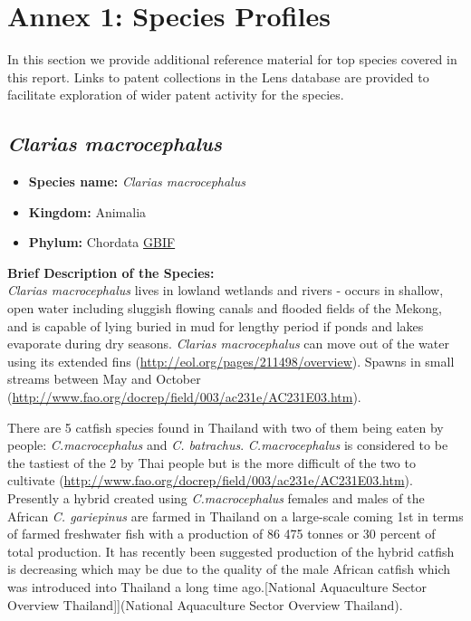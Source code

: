\documentclass[]{book}
\providecommand{\tightlist}{%
  \setlength{\itemsep}{0pt}\setlength{\parskip}{0pt}}
\theoremstyle{definition}
\theoremstyle{definition}
\theoremstyle{definition}
\theoremstyle{remark}
\begin{document}
\hypertarget{species}{%
\chapter{Annex 1: Species Profiles}\label{species}}

In this section we provide additional reference material for top species
covered in this report. Links to patent collections in the Lens database
are provided to facilitate exploration of wider patent activity for the
species.

\hypertarget{clarias-macrocephalus}{%
\section{\texorpdfstring{\emph{Clarias
macrocephalus}}{Clarias macrocephalus}}\label{clarias-macrocephalus}}

\begin{itemize}
\tightlist
\item
  \textbf{Species name:} \emph{Clarias macrocephalus}
\item
  \textbf{Kingdom:} Animalia\\
\item
  \textbf{Phylum:} Chordata
  \href{https://www.gbif.org/species/5202728}{GBIF}
\end{itemize}

\textbf{Brief Description of the Species:}\\
\emph{Clarias macrocephalus} lives in lowland wetlands and rivers -
occurs in shallow, open water including sluggish flowing canals and
flooded fields of the Mekong, and is capable of lying buried in mud for
lengthy period if ponds and lakes evaporate during dry seasons.
\emph{Clarias macrocephalus} can move out of the water using its
extended fins (\url{http://eol.org/pages/211498/overview}). Spawns in
small streams between May and October
(\url{http://www.fao.org/docrep/field/003/ac231e/AC231E03.htm}).

There are 5 catfish species found in Thailand with two of them being
eaten by people: \emph{C.macrocephalus} and \emph{C. batrachus}.
\emph{C.macrocephalus} is considered to be the tastiest of the 2 by Thai
people but is the more difficult of the two to cultivate
(\url{http://www.fao.org/docrep/field/003/ac231e/AC231E03.htm}).
Presently a hybrid created using \emph{C.macrocephalus} females and
males of the African \emph{C. gariepinus} are farmed in Thailand on a
large-scale coming 1st in terms of farmed freshwater fish with a
production of 86 475 tonnes or 30 percent of total production. It has
recently been suggested production of the hybrid catfish is decreasing
which may be due to the quality of the male African catfish which was
introduced into Thailand a long time ago.{[}National Aquaculture Sector
Overview Thailand{]}{]}(National Aquaculture Sector Overview Thailand).
\end{document}
